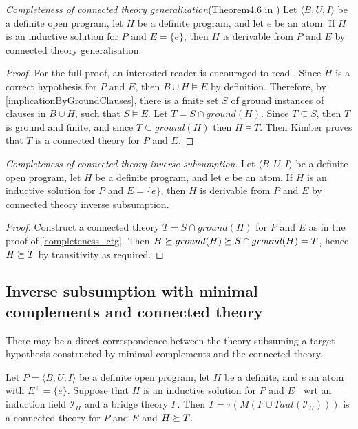 \begin{thm}\label{completeness_ctg}
\emph{Completeness of connected theory generalization}(Theorem4.6 in \cite{kimber2012learning})
Let $\langle B, U, I \rangle$ be a definite open program,
let $H$ be a definite program, and let $e$ be an atom.
If $H$ is an inductive solution for $P$ and
$E = \{e\}$, then $H$ is derivable from $P$ and $E$ by connected theory generalisation.
\end{thm}
\begin{proof}\cite{kimber2012learning}
For the full proof, an interested reader is encouraged to read \cite{kimber2012learning}.
Since $H$ is a correct hypothesis for $P$ and $E$,
then $B \cup H \models E$ by definition.
Therefore, by \ref{implicationByGroundClauses}, there is a finite set $S$ of ground instances of clauses in $B \cup H$,
such that $S \models E$. Let $T = S \cap ground(H)$.
Since $T \subseteq S$, then $T$ is ground and finite, and
since $T \subseteq ground(H)$ then $H \models T$. 
Then Kimber proves that $T$ is a connected theory for $P$ and $E$.
\end{proof}

\begin{thm}
\emph{Completeness of connected theory inverse subsumption}.
\label{completeness_ctis}
Let $\langle B, U, I \rangle$ be a definite open program,
let $H$ be a definite program, and let $e$ be an atom.
If $H$ is an inductive solution for $P$ and
$E = \{e\}$, then $H$ is derivable from $P$ and $E$ by connected theory inverse subsumption.
\end{thm}
\begin{proof}
Construct a connected theory $T=S \cap ground(H)$ for $P$ and $E$ as in the proof of \ref{completeness_ctg}.
Then $H \succeq ground(H) \succeq S \cap ground(H) = T$,
hence $H \succeq T$ by transitivity as required.
\end{proof}

\subsection{Inverse subsumption with minimal complements and connected theory}
There may be a direct correspondence between the theory subsuming a target hypothesis constructed by minimal complements and the connected theory.

\begin{conjecture}
Let $P=\langle B, U, I \rangle$ be a definite open program, let $H$ be a definite, and $e$ an atom with $E^+=\{e\}$. Suppose that $H$ is an inductive solution for $P$ and $E^+$ wrt an induction field $\mathcal{I}_H$ and a bridge theory $F$.
Then $T=\tau(M(F \cup Taut(\mathcal{I}_H)))$ is a connected theory for $P$ and $E$ and $H \succeq T$.
\end{conjecture}
